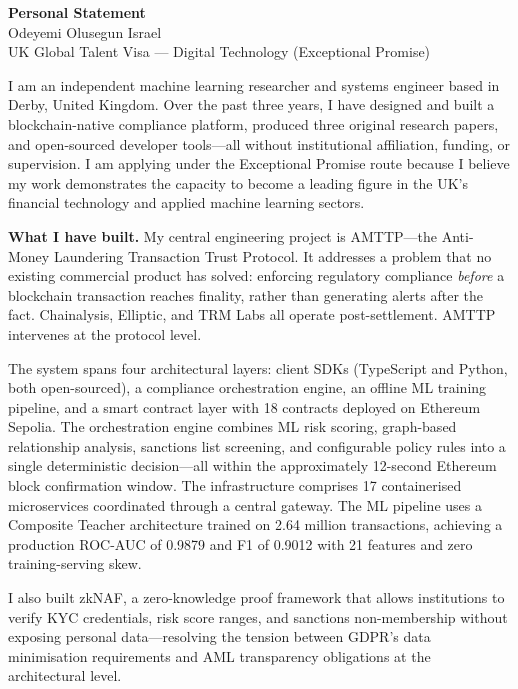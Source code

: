 \documentclass[12pt,a4paper]{article}
\begin{document}
\begin{center}
{\Large\bfseries Personal Statement}\\[4pt]
{\large Odeyemi Olusegun Israel}\\[2pt]
{\normalsize UK Global Talent Visa --- Digital Technology (Exceptional Promise)}
\end{center}

\bigskip

I am an independent machine learning researcher and systems engineer based in Derby, United Kingdom. Over the past three years, I have designed and built a blockchain-native compliance platform, produced three original research papers, and open-sourced developer tools---all without institutional affiliation, funding, or supervision. I am applying under the Exceptional Promise route because I believe my work demonstrates the capacity to become a leading figure in the UK's financial technology and applied machine learning sectors.

\textbf{What I have built.}
My central engineering project is AMTTP---the Anti-Money Laundering Transaction Trust Protocol. It addresses a problem that no existing commercial product has solved: enforcing regulatory compliance \textit{before} a blockchain transaction reaches finality, rather than generating alerts after the fact. Chainalysis, Elliptic, and TRM Labs all operate post-settlement. AMTTP intervenes at the protocol level.

The system spans four architectural layers: client SDKs (TypeScript and Python, both open-sourced), a compliance orchestration engine, an offline ML training pipeline, and a smart contract layer with 18 contracts deployed on Ethereum Sepolia. The orchestration engine combines ML risk scoring, graph-based relationship analysis, sanctions list screening, and configurable policy rules into a single deterministic decision---all within the approximately 12-second Ethereum block confirmation window. The infrastructure comprises 17 containerised microservices coordinated through a central gateway. The ML pipeline uses a Composite Teacher architecture trained on 2.64 million transactions, achieving a production ROC-AUC of 0.9879 and F1 of 0.9012 with 21 features and zero training-serving skew.

I also built zkNAF, a zero-knowledge proof framework that allows institutions to verify KYC credentials, risk score ranges, and sanctions non-membership without exposing personal data---resolving the tension between GDPR's data minimisation requirements and AML transparency obligations at the architectural level.
\end{document}
